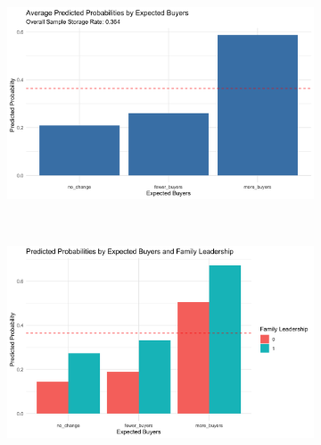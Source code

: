 


\begin{figure}[htbp]
    \centering
    \begin{subfigure}{\textwidth}
        \centering
        \includegraphics[height=0.28\textheight]{figures/overall_predicted_probs.png}
        \caption{}
    \end{subfigure}\\[2mm]
    
    \begin{subfigure}{\textwidth}
        \centering
        \includegraphics[height=0.28\textheight]{figures/predicted_probs_by_family.png}
        \caption{}
    \end{subfigure}\\[2mm]


\end{figure}
